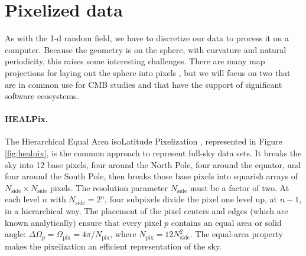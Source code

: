 \section{Pixelized data}
As with the 1-d random field, we have to discretize our data to process it on a computer.  Because the geometry is on the sphere, with curvature and natural periodicity, this raises some interesting challenges.  There are many map projections for laying out the sphere into pixels \citep{2002A&A...395.1077C}, but we will focus on two that are in common use for CMB studies and that have the support of significant software ecosystems.

\paragraph{HEALPix.}
The Hierarchical Equal Area isoLatitude Pixelization \citep[HEALPix,][]{2005ApJ...622..759G}, represented in Figure \ref{fig:healpix}, is the common approach to represent full-sky data sets.  It breaks the sky into 12 base pixels, four around the North Pole, four around the equator, and four around the South Pole, then breaks those base pixels into squarish arrays of  $N_\textrm{side} \times N_\textrm{side}$ pixels.  The resolution parameter $N_\textrm{side}$ must be a factor of two.  At each level $n$ with $N_\textrm{side} = 2^n$, four subpixels divide the pixel one level up, at $n-1$, in a hierarchical way.  The placement of the pixel centers and edges (which are known analytically) ensure that every pixel $p$ contains an equal area or solid angle: $\Delta\Omega_p = \Omega_\textrm{pix} = 4\pi/N_\textrm{pix}$, where 
$N_\textrm{pix} = 12 N_\textrm{side}^2$.  The equal-area property makes the pixelization an efficient representation of the sky.

